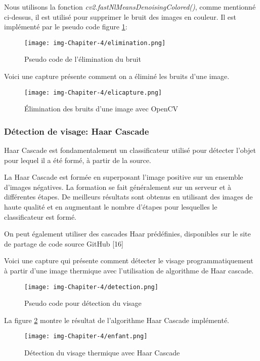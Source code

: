 \documentclass[12pt]{article}
\begin{document}
Nous utilisons la fonction \textit{cv2.fastNlMeansDenoisingColored()}, comme mentionné ci-dessus, il est utilisé pour supprimer le bruit des images en couleur. Il est implémenté par le pseudo code figure \ref{fig:pseudocodeelimination}:
\newpage
\begin{figure}[h]
	\centering
	\texttt{[image: img-Chapiter-4/elimination.png]}
	\caption{Pseudo code de l'élimination du bruit}
	\label{fig:pseudocodeelimination}
\end{figure}

Voici une capture présente comment on a éliminé les bruits d'une image.
\begin{figure}[h]
	\centering
	\texttt{[image: img-Chapiter-4/elicapture.png]}
	\caption{\' Elimination des bruits d'une image avec OpenCV}
\end{figure}
\subsubsection*{Détection de visage: Haar Cascade}
Haar Cascade est fondamentalement un classificateur utilisé pour détecter l'objet pour lequel il a été formé, à partir de la source.

La Haar Cascade est formée en superposant l'image positive sur un ensemble d'images négatives. La formation se fait généralement sur un serveur et à différentes étapes. De meilleurs résultats sont obtenus en utilisant des images de haute qualité et en augmentant le nombre d'étapes pour lesquelles le classificateur est formé.

On peut également utiliser des cascades Haar prédéfinies, disponibles sur le site de partage de code source GitHub [16]

Voici une capture qui présente comment détecter le visage programmatiquement à partir d'une image thermique avec l'utilisation de algorithme de Haar cascade.

\begin{figure}[h]
	\centering
	\texttt{[image: img-Chapiter-4/detection.png]}
	\caption{Pseudo code pour détection du visage}
\end{figure}

La figure \ref{fig:res} montre le résultat de l'algorithme Haar Cascade implémenté.
\begin{figure}[h]
	\centering
	\texttt{[image: img-Chapiter-4/enfant.png]}
	\caption{Détection du visage thermique avec Haar Cascade}
	\label{fig:res}
\end{figure}
\end{document}
